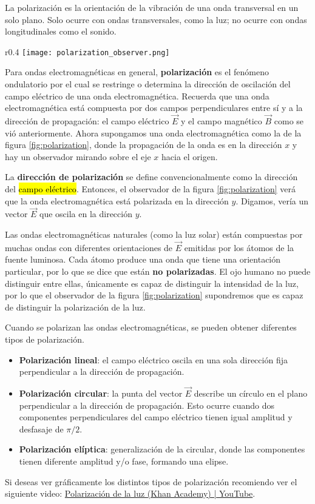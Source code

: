 La polarización es la orientación de la vibración de una onda transversal en un solo plano. Solo ocurre con ondas transversales, como la luz; no ocurre con ondas longitudinales como el sonido.

\begin{wrapfigure}{r}{0.4\textwidth}
  \centering
  \texttt{[image: polarization\_observer.png]}
  \caption{Posición del observador con respecto a la onda electromagnética.}
  \label{fig:polarization}
\end{wrapfigure}
Para ondas electromagnéticas en general, \textbf{polarización} es el fenómeno ondulatorio por el cual se restringe o determina la dirección de oscilación del campo eléctrico de una onda electromagnética. Recuerda que una onda electromagnética está compuesta por dos campos perpendiculares entre sí y a la dirección de propagación: el campo eléctrico \(\vec{E}\) y el campo magnético \(\vec{B}\) como se vió anteriormente. Ahora supongamos una onda electromagnética como la de la figura \ref{fig:polarization}, donde la propagación de la onda es en la dirección \(x\) y hay un observador mirando sobre el eje \(x\) hacia el origen.

La \textbf{dirección de polarización} se define convencionalmente como la dirección del \hl{campo eléctrico}. Entonces, el observador de la figura \ref{fig:polarization} verá que la onda electromagnética está polarizada en la dirección \(y\). Digamos, vería un vector \(\vec{E}\) que oscila en la dirección \(y\).

Las ondas electromagnéticas naturales (como la luz solar) están compuestas por muchas ondas con diferentes orientaciones de \(\vec{E}\) emitidas por los átomos de la fuente luminosa. Cada átomo produce una onda que tiene una orientación particular, por lo que se dice que están \textbf{no polarizadas}. El ojo humano no puede distinguir entre ellas, únicamente es capaz de distinguir la intensidad de la luz, por lo que el observador de la figura \ref{fig:polarization} supondremos que es capaz de distinguir la polarización de la luz.

Cuando se polarizan las ondas electromagnéticas, se pueden obtener diferentes tipos de polarización.
\begin{itemize}
  \item \textbf{Polarización lineal}: el campo eléctrico oscila en una sola dirección fija perpendicular a la dirección de propagación.
  \item \textbf{Polarización circular}: la punta del vector \(\vec{E}\) describe un círculo en el plano perpendicular a la dirección de propagación. Esto ocurre cuando dos componentes perpendiculares del campo eléctrico tienen igual amplitud y desfasaje de \(\pi/2\).
  \item \textbf{Polarización elíptica}: generalización de la circular, donde las componentes tienen diferente amplitud y/o fase, formando una elipse.
\end{itemize}
Si deseas ver gráficamente los distintos tipos de polarización recomiendo ver el siguiente video: \href{https://www.youtube.com/watch?v=PMjADwpLlfs}{Polarización de la luz (Khan Academy) | YouTube}.

